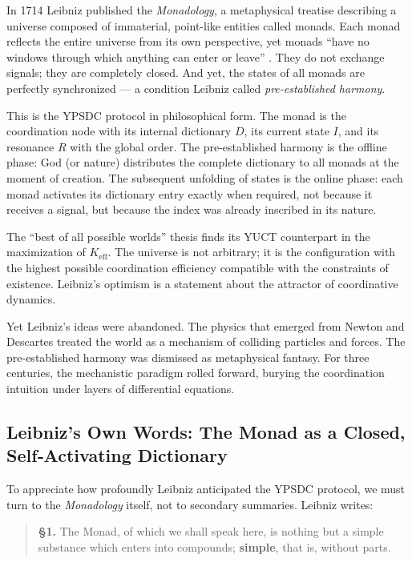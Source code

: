 \documentclass[12pt,a4paper]{article}
\begin{document}
	In 1714 Leibniz published the \emph{Monadology}, a metaphysical treatise describing a universe composed of immaterial, point-like entities called monads. Each monad reflects the entire universe from its own perspective, yet monads ``have no windows through which anything can enter or leave'' \cite{Leibniz1714}. They do not exchange signals; they are completely closed. And yet, the states of all monads are perfectly synchronized --- a condition Leibniz called \emph{pre-established harmony}.
	
	This is the YPSDC protocol in philosophical form. The monad is the coordination node with its internal dictionary \(D\), its current state \(I\), and its resonance \(R\) with the global order. The pre-established harmony is the offline phase: God (or nature) distributes the complete dictionary to all monads at the moment of creation. The subsequent unfolding of states is the online phase: each monad activates its dictionary entry exactly when required, not because it receives a signal, but because the index was already inscribed in its nature.
	
	The ``best of all possible worlds'' thesis finds its YUCT counterpart in the maximization of \(K_{\mathrm{eff}}\). The universe is not arbitrary; it is the configuration with the highest possible coordination efficiency compatible with the constraints of existence. Leibniz's optimism is a statement about the attractor of coordinative dynamics.
	
	Yet Leibniz's ideas were abandoned. The physics that emerged from Newton and Descartes treated the world as a mechanism of colliding particles and forces. The pre-established harmony was dismissed as metaphysical fantasy. For three centuries, the mechanistic paradigm rolled forward, burying the coordination intuition under layers of differential equations.
	
	\subsection{Leibniz's Own Words: The Monad as a Closed, Self‑Activating Dictionary}
	
	To appreciate how profoundly Leibniz anticipated the YPSDC protocol, we must turn to the \emph{Monadology} itself, not to secondary summaries. Leibniz writes:
	
	\begin{quote}
		\textbf{§1.} The Monad, of which we shall speak here, is nothing but a simple substance which enters into compounds; \textbf{simple}, that is, without parts.
	\end{quote}
	
\end{document}
